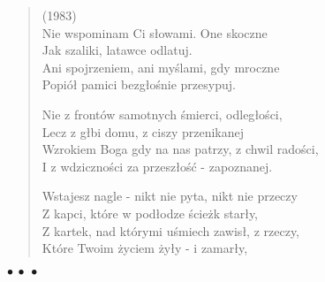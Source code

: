 \documentclass{article} %
\newenvironment{wierszd}[2]
	{\begin{verse} \hspace*{-1em}{\bf #1}\hfill{\small{(#2)}}\\[.5ex] }
	{\end{verse} \begin{center}$\bullet\ \bullet\ \bullet$\end{center}}
\newcommand{\old}[1]{}
\newcommand{\e}{\eob}
\renewcommand{\a}{\aob}
\renewcommand{\o}{\'{o}}
\newcommand{\z}{\'{z}}
\newcommand{\n}{\'{n}}
\newcommand{\s}{\'{s}}
\renewcommand{\S}{\'{S}}
\newcommand{\ci}{\'{c}}
\begin{document}
\begin{wierszd}{}{1983}
Nie wspominam Ci{\e} s{\l}owami. One skoczne \\
Jak szaliki, latawce odlatuj{\a}. \\
Ani spojrzeniem, ani my{\s}lami, gdy mroczne  \\
Popi{\o}{\l} pami{\e}ci bezg{\l}o{\s}nie przesypuj{\a}.

Nie z front{\o}w samotnych {\s}mierci, odleg{\l}o{\s}ci, \\
Lecz z g{\l}{\e}bi domu, z ciszy przenikanej \\
Wzrokiem Boga gdy na nas patrzy, z chwil rado{\s}ci, \\
I z wdzi{\e}czno{\s}ci za przesz{\l}o{\s}{\ci} - zapoznanej.

Wstajesz nagle - nikt nie pyta, nikt nie przeczy \\
Z kapci, kt{\o}re w pod{\l}odze {\s}cie\.{z}k{\e} star{\l}y, \\
Z kartek, nad kt{\o}rymi u{\s}miech zawis{\l}, z rzeczy, \\
Kt{\o}re Twoim \.{z}yciem \.{z}y{\l}y - i zamar{\l}y,

\end{wierszd}

\old{

\begin{wierszd}{}{1999}
To by{\l}y dni bez liczb, bez godzin,\\
Twoje w{\l}osy {\s}piewa{\l}y ptakami\\
{\S}wit zwiastuj{\a}c z g{\l}{\e}bi parku\\
Milcz{\a}cego ciemno{\s}ci wiekami.

I twoje oczy patrzy{\l}y spo{\s}r{\o}d drzew\\
Skrzeniem stawu i {\z}r{\o}de{\l} z zieleni,\\
W cieniu marze{\n} gotowych do lotu,\\
Skrzyde{\l} ufnych nadziej{\a} przestrzeni.

Wi{\e}c by{\l}y dni bez liczb, bez godzin,\\
Gdy obietnic{\a} by{\l} najl\.{z}ejszy cie{\n},\\
A cisza dr\.{z}a{\l}a w samotno{\s}ci cia{\l}\\
Oczekiwaniem na poprzedni dzie{\n}.\\
\end{wierszd}

} %
\end{document}

